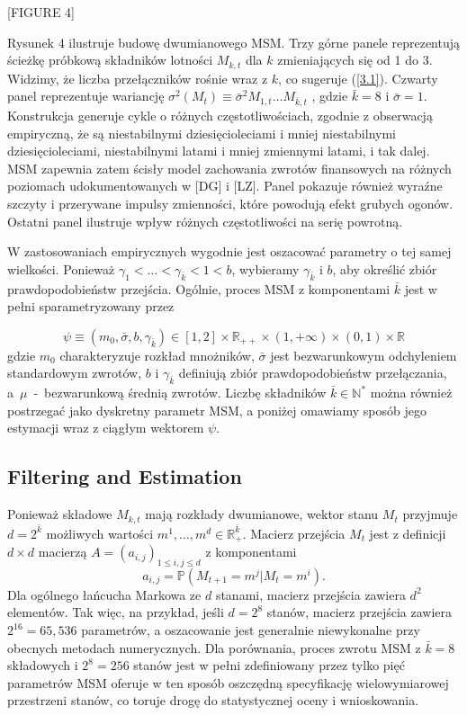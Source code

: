 \documentclass[12pt]{article}
\theoremstyle{definition}
\begin{document}
\begin{center}
[FIGURE 4]
\end{center}

Rysunek 4 ilustruje budowę dwumianowego MSM. Trzy górne panele reprezentują ścieżkę próbkową składników lotności 
$M_{k,t}$ dla $k$ zmieniających się od 1 do 3. Widzimy, że liczba przełączników rośnie wraz z $k$, co sugeruje (\ref{3.1}). Czwarty panel reprezentuje wariancję $\sigma^2(M_t) \equiv \bar{\sigma}^2 M_{1,t}\ldots M_{\bar{k},t}$ , gdzie $\bar{k}=8$ i $\bar{\sigma}=1$. Konstrukcja generuje cykle o różnych częstotliwościach, zgodnie z obserwacją empiryczną, że są niestabilnymi dziesięcioleciami i mniej niestabilnymi dziesięcioleciami, niestabilnymi latami i mniej zmiennymi latami, i tak dalej. MSM zapewnia zatem ścisły model zachowania zwrotów finansowych na różnych poziomach udokumentowanych w [DG] i [LZ]. Panel pokazuje również wyraźne szczyty i przerywane impulsy zmienności, które powodują efekt grubych ogonów. Ostatni panel ilustruje wpływ różnych częstotliwości na serię powrotną.

W zastosowaniach empirycznych wygodnie jest oszacować parametry o tej samej wielkości. Ponieważ $\gamma_1 < \ldots < \gamma_{\bar{k}} <1<b$, wybieramy $\gamma_{\bar{k}}$ i $b$, aby określić zbiór prawdopodobieństw przejścia. Ogólnie, proces MSM z komponentami $\bar{k}$ jest w pełni sparametryzowany przez

$$\psi \equiv (m_0, \bar{\sigma}, b, \gamma_{\bar{k}}) \in [1,2] \times \mathbb{R}_{++} \times (1, +\infty) \times (0,1) \times \mathbb{R}$$
gdzie $m_0$ charakteryzuje rozkład mnożników, $\bar{\sigma}$ jest bezwarunkowym odchyleniem standardowym zwrotów, $b$ i $\gamma_{\bar{k}}$ definiują zbiór prawdopodobieństw przełączania, a~$\mu$~-~bezwarunkową średnią zwrotów. Liczbę składników $\bar{k} \in \mathbb{N}^\ast$ można również postrzegać jako dyskretny parametr MSM, a poniżej omawiamy sposób jego estymacji wraz z ciągłym wektorem $\psi$.

\subsection{Filtering and Estimation}
Ponieważ składowe $M_{k,t}$ mają rozkłady dwumianowe, wektor stanu $M_t$ przyjmuje $d=2^{\bar{k}}$ możliwych wartości $m^1,\ldots, m^d \in \mathbb{R}^{\bar{k}}_{+}$. Macierz przejścia $M_t$ jest z definicji $d \times d$ macierzą $A=(a_{i,j})_{1\leq i, j\leq d}$ z komponentami
$$a_{i,j} = \mathbb{P}(M_{t+1}=m^j|M_t=m^i).$$
Dla ogólnego łańcucha Markowa ze $d$ stanami, macierz przejścia zawiera $d^2$ elementów. Tak więc, na przykład, jeśli $d=2^8$ stanów, macierz przejścia zawiera $2^16 = 65,536$ parametrów, a oszacowanie jest generalnie niewykonalne przy obecnych metodach numerycznych. Dla porównania, proces zwrotu MSM z $\bar{k} = 8$ składowych i $2^8=256$ stanów jest w pełni zdefiniowany przez tylko pięć parametrów MSM oferuje w ten sposób oszczędną specyfikację wielowymiarowej przestrzeni stanów, co toruje drogę do statystycznej oceny i wnioskowania.
\end{document}
